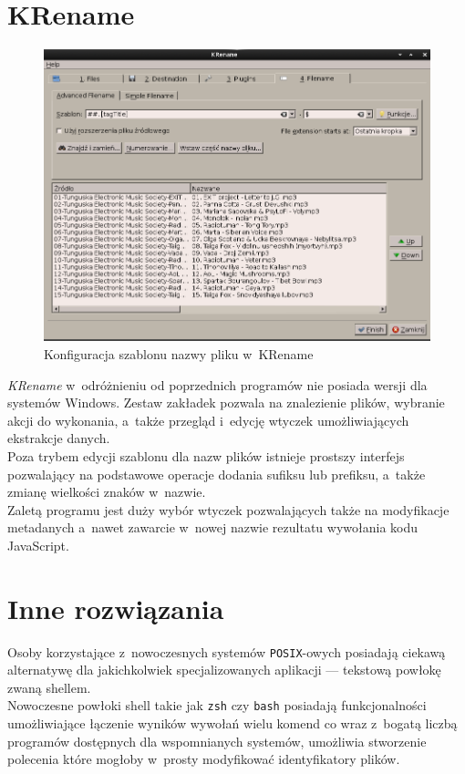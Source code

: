 \section{KRename}
\begin{figure}[h]
\begin{center}
\includegraphics[scale=0.55]{img/krename_window.png}
\end{center}
\caption{Konfiguracja szablonu nazwy pliku w~KRename}
\end{figure}

\par
\textit{KRename} w~odróżnieniu od poprzednich programów nie posiada wersji dla systemów Windows. Zestaw zakładek pozwala na znalezienie plików, wybranie akcji do wykonania, a~także przegląd i~edycję wtyczek umożliwiających ekstrakcje danych.\\
Poza trybem edycji szablonu dla nazw plików istnieje prostszy interfejs pozwalający na podstawowe operacje dodania sufiksu lub prefiksu, a~także zmianę wielkości znaków w~nazwie.\\
Zaletą programu jest duży wybór wtyczek pozwalających także na modyfikacje metadanych a~nawet zawarcie w~nowej nazwie rezultatu wywołania kodu JavaScript.

\section{Inne rozwiązania}
\par
Osoby korzystające z~nowoczesnych systemów \texttt{POSIX}-owych posiadają ciekawą alternatywę dla jakichkolwiek specjalizowanych aplikacji --- tekstową powłokę zwaną shellem.\\
Nowoczesne powłoki shell takie jak \texttt{zsh} czy \texttt{bash} posiadają funkcjonalności umożliwiające łączenie wyników wywołań wielu komend co wraz z~bogatą liczbą programów dostępnych dla wspomnianych systemów, umożliwia stworzenie polecenia które mogłoby w~prosty modyfikować identyfikatory plików.\\


